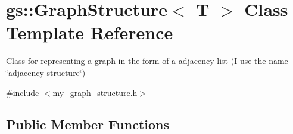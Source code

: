 \hypertarget{classgs_1_1_graph_structure}{}\section{gs\+:\+:Graph\+Structure$<$ T $>$ Class Template Reference}
\label{classgs_1_1_graph_structure}


Class for representing a graph in the form of a adjacency list (I use the name \char`\"{}adjacency structure\char`\"{})  




{\ttfamily \#include $<$my\+\_\+graph\+\_\+structure.\+h$>$}

\subsection*{Public Member Functions}
